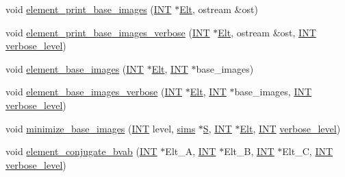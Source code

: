 \begin{DoxyCompactItemize}
\item 
void \mbox{\hyperlink{classaction_ad69d6278c50f23aee06fdd42423f9b8c}{element\+\_\+print\+\_\+base\+\_\+images}} (\mbox{\hyperlink{galois_8h_a09fddde158a3a20bd2dcadb609de11dc}{I\+NT}} $\ast$\mbox{\hyperlink{simeon_8_c_aec1406935bdb1fee3561fcb840964100}{Elt}}, ostream \&ost)
\item 
void \mbox{\hyperlink{classaction_a75a205a349711d606c041fcdf5efb849}{element\+\_\+print\+\_\+base\+\_\+images\+\_\+verbose}} (\mbox{\hyperlink{galois_8h_a09fddde158a3a20bd2dcadb609de11dc}{I\+NT}} $\ast$\mbox{\hyperlink{simeon_8_c_aec1406935bdb1fee3561fcb840964100}{Elt}}, ostream \&ost, \mbox{\hyperlink{galois_8h_a09fddde158a3a20bd2dcadb609de11dc}{I\+NT}} \mbox{\hyperlink{simeon_8_c_a818073fbcc2f439e7c56952f67386122}{verbose\+\_\+level}})
\item 
void \mbox{\hyperlink{classaction_afd647915ce11b6ce42455e33999dd822}{element\+\_\+base\+\_\+images}} (\mbox{\hyperlink{galois_8h_a09fddde158a3a20bd2dcadb609de11dc}{I\+NT}} $\ast$\mbox{\hyperlink{simeon_8_c_aec1406935bdb1fee3561fcb840964100}{Elt}}, \mbox{\hyperlink{galois_8h_a09fddde158a3a20bd2dcadb609de11dc}{I\+NT}} $\ast$base\+\_\+images)
\item 
void \mbox{\hyperlink{classaction_a1e9bc21306d122f1c7b5b8d98d2d6dfd}{element\+\_\+base\+\_\+images\+\_\+verbose}} (\mbox{\hyperlink{galois_8h_a09fddde158a3a20bd2dcadb609de11dc}{I\+NT}} $\ast$\mbox{\hyperlink{simeon_8_c_aec1406935bdb1fee3561fcb840964100}{Elt}}, \mbox{\hyperlink{galois_8h_a09fddde158a3a20bd2dcadb609de11dc}{I\+NT}} $\ast$base\+\_\+images, \mbox{\hyperlink{galois_8h_a09fddde158a3a20bd2dcadb609de11dc}{I\+NT}} \mbox{\hyperlink{simeon_8_c_a818073fbcc2f439e7c56952f67386122}{verbose\+\_\+level}})
\item 
void \mbox{\hyperlink{classaction_a93d3f510f8678d02b8f246863b542317}{minimize\+\_\+base\+\_\+images}} (\mbox{\hyperlink{galois_8h_a09fddde158a3a20bd2dcadb609de11dc}{I\+NT}} level, \mbox{\hyperlink{classsims}{sims}} $\ast$\mbox{\hyperlink{simeon_8_c_adab47f8243f1b5a2c31df2535d6b37d0}{S}}, \mbox{\hyperlink{galois_8h_a09fddde158a3a20bd2dcadb609de11dc}{I\+NT}} $\ast$\mbox{\hyperlink{simeon_8_c_aec1406935bdb1fee3561fcb840964100}{Elt}}, \mbox{\hyperlink{galois_8h_a09fddde158a3a20bd2dcadb609de11dc}{I\+NT}} \mbox{\hyperlink{simeon_8_c_a818073fbcc2f439e7c56952f67386122}{verbose\+\_\+level}})
\item 
void \mbox{\hyperlink{classaction_a120a6a559d089e5f70c8d08337c9eda1}{element\+\_\+conjugate\+\_\+bvab}} (\mbox{\hyperlink{galois_8h_a09fddde158a3a20bd2dcadb609de11dc}{I\+NT}} $\ast$Elt\+\_\+A, \mbox{\hyperlink{galois_8h_a09fddde158a3a20bd2dcadb609de11dc}{I\+NT}} $\ast$Elt\+\_\+B, \mbox{\hyperlink{galois_8h_a09fddde158a3a20bd2dcadb609de11dc}{I\+NT}} $\ast$Elt\+\_\+C, \mbox{\hyperlink{galois_8h_a09fddde158a3a20bd2dcadb609de11dc}{I\+NT}} \mbox{\hyperlink{simeon_8_c_a818073fbcc2f439e7c56952f67386122}{verbose\+\_\+level}})

\end{DoxyCompactItemize}

